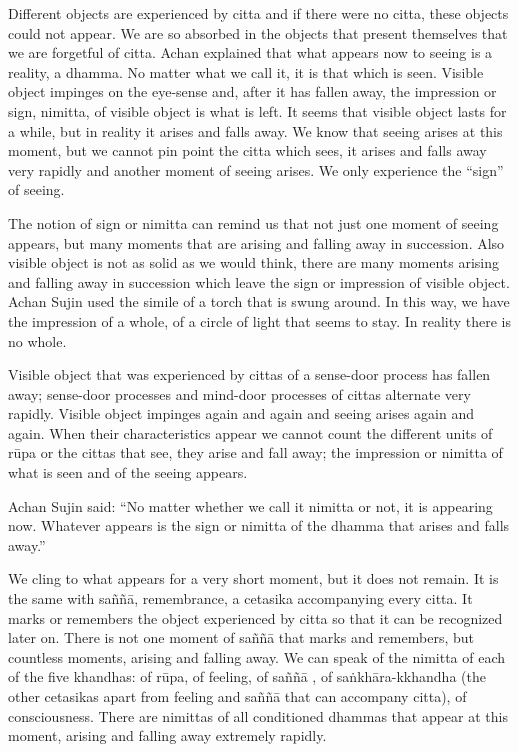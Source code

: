 Different objects are experienced by citta and if there were no citta, these objects 
could not appear. We are so absorbed in the objects that present themselves that we 
are forgetful of citta.  Achan explained that what appears now to seeing is a reality, a 
dhamma. No matter what we call it, it is that which is seen. Visible object impinges 
on the eye-sense and, after it has fallen away, the impression or sign, nimitta, of visible object is what is left. It seems that visible object lasts for a while, but in reality it 
arises and falls away. We know that seeing arises at this moment, but we cannot pin 
point the citta which sees, it arises and falls away very rapidly and another moment of 
seeing arises. We only experience the ``sign'' of seeing. 

The notion of sign or nimitta can remind us that not just one moment of seeing appears, but many moments that are arising and falling away in succession. Also visible 
object is not as solid as we would think, there are many moments arising and falling 
away in succession which leave the sign or impression of visible object.  Achan Sujin 
used the simile of a torch that is swung around. In this way, we have the impression 
of a whole, of a circle of light that seems to stay. In reality there is no whole. 

Visible object that was experienced by cittas of a sense-door process has fallen away; 
sense-door processes and mind-door processes of cittas alternate very rapidly. Visible 
object impinges again and again and seeing arises again and again. When their characteristics appear we cannot count the different units of rūpa or the cittas that see, 
they arise and fall away; the impression or nimitta of what is seen and of the seeing 
appears. 

Achan Sujin said: ``No matter whether we call it nimitta or not, it is appearing now. 
Whatever appears is the sign or nimitta of the dhamma that arises and falls away.'' 

We cling to what appears for a very short moment, but it does not remain. It is the 
same with saññā, remembrance, a cetasika accompanying every citta. It marks or remembers the object experienced by citta so that it can be recognized later on. There is 
not one moment of saññā that marks and remembers, but countless moments, arising 
and falling away. We can speak of the nimitta of each of the five khandhas: of rūpa, 
of feeling, of saññā , of saṅkhāra-kkhandha (the other cetasikas apart from feeling and 
saññā that can accompany citta), of consciousness. There are nimittas of all conditioned dhammas that appear at this moment, arising and falling away extremely rapidly. 

